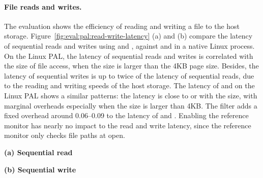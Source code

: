 \paragraph{File reads and writes.}
The evaluation shows the efficiency of reading and writing a file to the host storage.
Figure~\ref{fig:eval:pal:read-write-latency} (a) and (b) compare the latency of sequential reads and writes 
using  and , 
against
 and 
in a native Linux process.
On the Linux PAL,
the latency of sequential reads and writes
is correlated
with the size of file access,
when the size is larger than the 4KB page size.
Besides, the latency of sequential writes is up to twice of the latency of sequential reads,
due to the reading and writing speeds
of the host storage.
The latency of 
 and 
on the Linux PAL
shows a similar patterns:
the latency is close to  or  with the size,
with marginal overheads especially when
the size is larger than 4KB.
The \seccomp{} filter adds a fixed overhead around 0.06--0.09 \msec{} to the latency of  and .
Enabling the reference monitor has nearly no impact to the read and write latency,
since the reference monitor only checks file paths at open.
 


\begin{figure*}[t!]
\centering
\footnotesize
{}
\parbox{0.49\textwidth}{\centering\bf (a) Sequential read}
\parbox{0.49\textwidth}{\centering\bf (b) Sequential write}
\caption{Latency of sequential  and  on the Linux PAL,
versus  and  on Linux.
Lower is better.
Figure (a) and (b) respectively compares  and  on the Linux PAL,
with and without a \seccomp{} filter ({\bf +SC})
and reference monitor ({\bf +RM}), against  and  on Linux.}
\label{fig:eval:pal:read-write-latency}
\end{figure*}





